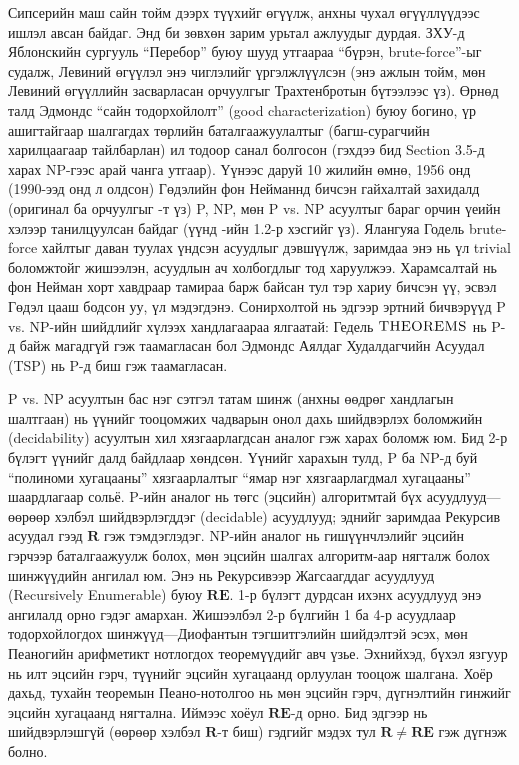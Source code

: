 Сипсерийн \cite{Sip92} маш сайн тойм дээрх түүхийг өгүүлж, анхны чухал өгүүллүүдээс ишлэл авсан байдаг. Энд би зөвхөн зарим урьтал ажлуудыг дурдая. ЗХУ-д Яблонскийн сургууль “Перебор” буюу шууд утгаараа “бүрэн, brute-force”-ыг судалж, Левиний өгүүлэл энэ чиглэлийг үргэлжлүүлсэн (энэ ажлын тойм, мөн Левиний өгүүллийн засварласан орчуулгыг Трахтенбротын \cite{Tra84} бүтээлээс үз). Өрнөд талд Эдмондс \cite{Edm66} “сайн тодорхойлолт” (good characterization) буюу богино, үр ашигтайгаар шалгагдах төрлийн баталгаажуулалтыг (багш-сурагчийн харилцаагаар тайлбарлан) ил тодоор санал болгосон (гэхдээ бид Section 3.5-д харах NP-гээс арай чанга утгаар). Үүнээс даруй 10 жилийн өмнө, 1956 онд (1990-ээд онд л олдсон) Гөдэлийн фон Нейманнд бичсэн гайхалтай захидалд (оригинал ба орчуулгыг \cite{Sip92}-т үз) P, NP, мөн P vs. NP асуултыг бараг орчин үеийн хэлээр танилцуулсан байдаг (үүнд \cite{Wig10b}-ийн 1.2-р хэсгийг үз). Ялангуяа Годель brute-force хайлтыг даван туулах үндсэн асуудлыг дэвшүүлж, заримдаа энэ нь үл trivial боломжтойг жишээлэн, асуудлын ач холбогдлыг тод харуулжээ. Харамсалтай нь фон Нейман хорт хавдраар тамираа барж байсан тул тэр хариу бичсэн үү, эсвэл Гөдэл цааш бодсон уу, үл мэдэгдэнэ. Сонирхолтой нь эдгээр эртний бичвэрүүд P vs. NP-ийн шийдлийг хүлээх хандлагаараа ялгаатай: Гедель $\textsc{THEOREMS}$ нь P-д байж магадгүй гэж таамагласан бол Эдмондс \cite{Edm67a} Аялдаг Худалдагчийн Асуудал (TSP) нь P-д биш гэж таамагласан.


P vs. NP асуултын бас нэг сэтгэл татам шинж (анхны өөдрөг хандлагын шалтгаан) нь үүнийг тооцомжих чадварын онол дахь шийдвэрлэх боломжийн (decidability) асуултын хил хязгаарлагдсан аналог гэж харах боломж юм. Бид 2-р бүлэгт үүнийг далд байдлаар хөндсөн. Үүнийг харахын тулд, P ба NP-д буй “полиноми хугацааны” хязгаарлалтыг “ямар нэг хязгаарлагдмал хугацааны” шаардлагаар сольё. P-ийн аналог нь төгс (эцсийн) алгоритмтай бүх асуудлууд—өөрөөр хэлбэл шийдвэрлэгддэг (decidable) асуудлууд; эднийг заримдаа Рекурсив асуудал гээд $\mathbf{R}$ гэж тэмдэглэдэг. NP-ийн аналог нь гишүүнчлэлийг эцсийн гэрчээр баталгаажуулж болох, мөн эцсийн шалгах алгоритм-аар нягталж болох шинжүүдийн ангилал юм. Энэ нь Рекурсивээр Жагсаагддаг асуудлууд (Recursively Enumerable) буюу $ \mathbf{RE}$. 1-р бүлэгт дурдсан ихэнх асуудлууд энэ ангилалд орно гэдэг амархан. Жишээлбэл 2-р бүлгийн 1 ба 4-р асуудлаар тодорхойлогдох шинжүүд—Диофантын тэгшитгэлийн шийдэлтэй эсэх, мөн Пеаногийн арифметикт нотлогдох теоремүүдийг авч үзье. Эхнийхэд, бүхэл язгуур нь илт эцсийн гэрч, түүнийг эцсийн хугацаанд орлуулан тооцож шалгана. Хоёр дахьд, тухайн теоремын Пеано-нотолгоо нь мөн эцсийн гэрч, дүгнэлтийн гинжийг эцсийн хугацаанд нягтална. Иймээс хоёул $\mathbf{RE}$-д орно. Бид эдгээр нь шийдвэрлэшгүй (өөрөөр хэлбэл $\mathbf{R}$-т биш) гэдгийг мэдэх тул $\mathbf{R} \ne \mathbf{RE}$ гэж дүгнэж болно.



